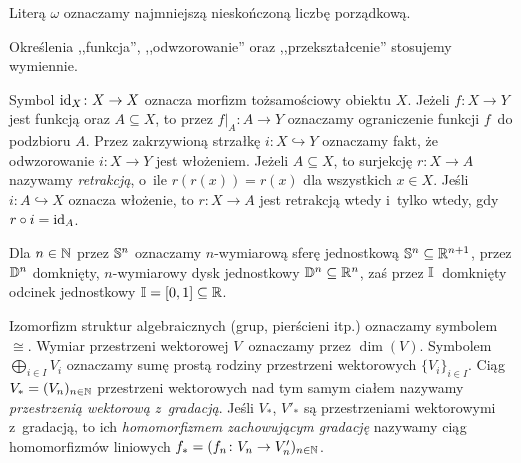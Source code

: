 Literą $\omega$ oznaczamy najmniejszą nieskończoną liczbę porządkową.

Określenia ,,funkcja'', ,,odwzorowanie'' oraz ,,przekształcenie'' stosujemy wymiennie.

Symbol $\id_X\colon X\to X$ oznacza morfizm tożsamościowy obiektu $X$. Jeżeli $f\colon X\to Y$ jest funkcją oraz $A\subseteq X$, to przez $f\big|_A\colon A\to Y$ oznaczamy ograniczenie funkcji $f$~do podzbioru $A$. Przez zakrzywioną strzałkę $i\colon X\hookrightarrow Y$ oznaczamy fakt, że odwzorowanie $i\colon X\to Y$ jest włożeniem. Jeżeli $A\subseteq X$, to surjekcję $r\colon X\to A$ nazywamy \textit{retrakcją}, o~ile $r(r(x))=r(x)$ dla wszystkich $x\in X$. Jeśli $i\colon A\hookrightarrow X$ oznacza włożenie, to $r\colon X\to A$ jest retrakcją wtedy i~tylko wtedy, gdy $r\circ i=\id_A$.

Dla $n\in\mN$ przez $\S^n$ oznaczamy $n$-wymiarową sferę jednostkową $\S^n\subseteq \mathbb{R}^{n+1}$, przez $\D^n$ domknięty, $n$-wymiarowy dysk jednostkowy $\D^n\subseteq \mathbb{R}^n$, zaś przez $\I$~domknięty odcinek jednostkowy $\I=[0,1]\subseteq \mathbb{R}$.

Izomorfizm struktur algebraicznych (grup, pierścieni itp.) oznaczamy symbolem~$\cong$. Wymiar przestrzeni wektorowej $V$~oznaczamy przez $\dim(V)$. Symbolem $\bigoplus_{i\in I} V_i$ oznaczamy sumę prostą rodziny przestrzeni wektorowych $\{V_i\}_{i\in I}$. Ciąg $V_*=(V_n)_{n\in\mN}$ przestrzeni wektorowych nad tym samym ciałem nazywamy \textit{przestrzenią wektorową z~gradacją}. Jeśli $V_*$, $V'_*$ są przestrzeniami wektorowymi z~gradacją, to ich \textit{homomorfizmem zachowującym gradację} nazywamy ciąg homomorfizmów liniowych $f_*=(f_n\colon V_n\to V_n')_{n\in\mN}$.


